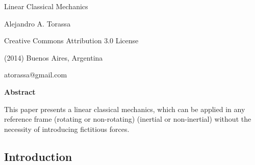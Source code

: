 \documentclass[10pt]{article}
\begin{document}
\begin{center}

{\huge Linear Classical Mechanics}

\bigskip \bigskip

{\large Alejandro A. Torassa}

\bigskip \bigskip

\small

Creative Commons Attribution 3.0 License

(2014) Buenos Aires, Argentina

atorassa@gmail.com

\bigskip \medskip

{\bf Abstract}

\bigskip

\parbox{93mm}{This paper presents a linear classical mechanics, which can be applied in any reference frame (rotating or non-rotating) (inertial or non-inertial) without the necessity of introducing fictitious forces.}

\end{center}

\normalsize

\vspace{-0.30em}

{\centering\subsection*{Introduction}}

\vspace{+1.20em}
\end{document}
